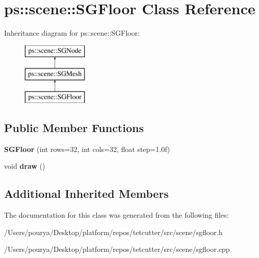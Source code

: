 \hypertarget{classps_1_1scene_1_1SGFloor}{}\section{ps\+:\+:scene\+:\+:S\+G\+Floor Class Reference}
\label{classps_1_1scene_1_1SGFloor}
Inheritance diagram for ps\+:\+:scene\+:\+:S\+G\+Floor\+:\begin{figure}[H]
\begin{center}
\leavevmode
\includegraphics[height=3.000000cm]{classps_1_1scene_1_1SGFloor}
\end{center}
\end{figure}
\subsection*{Public Member Functions}
\begin{DoxyCompactItemize}
\item 
\hypertarget{classps_1_1scene_1_1SGFloor_a7bb0778ee29d7f18a1bb9f20c970f84a}{}{\bfseries S\+G\+Floor} (int rows=32, int cols=32, float step=1.\+0f)\label{classps_1_1scene_1_1SGFloor_a7bb0778ee29d7f18a1bb9f20c970f84a}

\item 
\hypertarget{classps_1_1scene_1_1SGFloor_a01e59616eb27367b8228084266fcf277}{}void {\bfseries draw} ()\label{classps_1_1scene_1_1SGFloor_a01e59616eb27367b8228084266fcf277}

\end{DoxyCompactItemize}
\subsection*{Additional Inherited Members}


The documentation for this class was generated from the following files\+:\begin{DoxyCompactItemize}
\item 
/\+Users/pourya/\+Desktop/platform/repos/tetcutter/src/scene/sgfloor.\+h\item 
/\+Users/pourya/\+Desktop/platform/repos/tetcutter/src/scene/sgfloor.\+cpp\end{DoxyCompactItemize}
